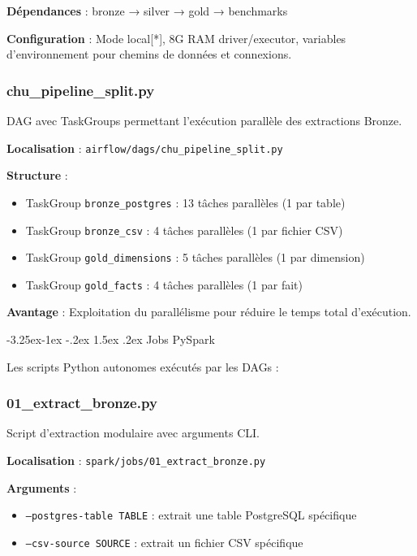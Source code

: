 \documentclass[12pt,a4paper]{article}
\makeatletter
\renewcommand\subsection{\@startsection{subsection}{2}{\z@}%
    {-3.25ex\@plus -1ex \@minus -.2ex}%
    {1.5ex \@plus .2ex}%
    {\normalfont\large\bfseries\color{blue!50!black}}}
\makeatother
\begin{document}
\textbf{Dépendances} : bronze → silver → gold → benchmarks

\textbf{Configuration} : Mode local[*], 8G RAM driver/executor, variables d'environnement pour chemins de données et connexions.

\subsubsection{chu\_pipeline\_split.py}

DAG avec TaskGroups permettant l'exécution parallèle des extractions Bronze.

\textbf{Localisation} : \texttt{airflow/dags/chu\_pipeline\_split.py}

\textbf{Structure} :
\begin{itemize}
\item TaskGroup \texttt{bronze\_postgres} : 13 tâches parallèles (1 par table)
\item TaskGroup \texttt{bronze\_csv} : 4 tâches parallèles (1 par fichier CSV)
\item TaskGroup \texttt{gold\_dimensions} : 5 tâches parallèles (1 par dimension)
\item TaskGroup \texttt{gold\_facts} : 4 tâches parallèles (1 par fait)
\end{itemize}

\textbf{Avantage} : Exploitation du parallélisme pour réduire le temps total d'exécution.

\subsection{Jobs PySpark}

Les scripts Python autonomes exécutés par les DAGs :

\subsubsection{01\_extract\_bronze.py}

Script d'extraction modulaire avec arguments CLI.

\textbf{Localisation} : \texttt{spark/jobs/01\_extract\_bronze.py}

\textbf{Arguments} :
\begin{itemize}
\item \texttt{--postgres-table TABLE} : extrait une table PostgreSQL spécifique
\item \texttt{--csv-source SOURCE} : extrait un fichier CSV spécifique
\end{itemize}
\end{document}
